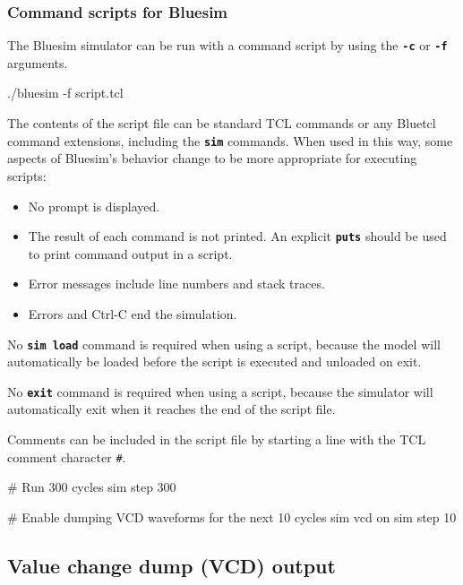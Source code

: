 \documentclass{article}
\newenvironment{centerboxverbatim}
  {\center
   \boxedverbatim}
  {\endboxedverbatim
  {\endcenter }}
\begin{document}
\subsubsection{Command scripts for Bluesim}

The Bluesim simulator can be run with a command script
by using the {\bf\tt -c} or {\bf\tt -f} arguments.

\begin{centerboxverbatim}
./bluesim -f script.tcl
\end{centerboxverbatim}

The contents of the script file can be standard TCL commands or
any Bluetcl command extensions, including the {\bf\tt sim} commands.
When used in this way, some aspects of Bluesim's behavior change to be
more appropriate for executing scripts:
\begin{itemize}
\item
No prompt is displayed.
\item
The result of each command is not printed.  An explicit {\bf\tt puts}
should be used to print command output in a script.
\item
Error messages include line numbers and stack traces.
\item
Errors and Ctrl-C end the simulation.
\end{itemize}

No {\bf\tt sim load} command is required when using a script, because
the model will automatically be loaded before the script is executed
and unloaded on exit.

No {\bf\tt exit} command is required when using a script, because the
simulator will automatically exit when it reaches the end of the
script file.

Comments can be included in the script file by starting a line
with the TCL comment character {\tt \#}.

\begin{centerboxverbatim}
# Run 300 cycles
sim step 300

# Enable dumping VCD waveforms for the next 10 cycles
sim vcd on
sim step 10
\end{centerboxverbatim}


\subsection{Value change dump (VCD) output}
\end{document}
